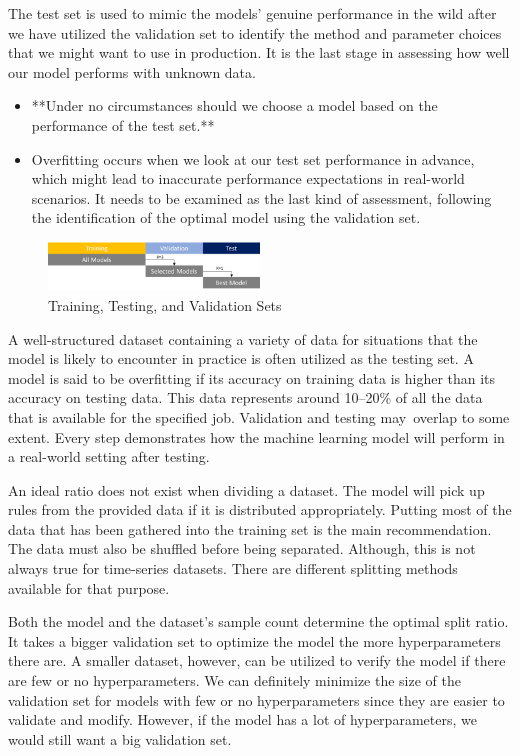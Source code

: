 The test set is used to mimic the models' genuine performance in the wild after we have utilized the validation set to identify the method and parameter choices that we might want to use in production. It is the last stage in assessing how well our model performs with unknown data.

\begin{itemize}
    \item **Under no circumstances should we choose a model based on the performance of the test set.**
    \item Overfitting occurs when we look at our test set performance in advance, which might lead to inaccurate performance expectations in real-world scenarios. It needs to be examined as the last kind of assessment, following the identification of the optimal model using the validation set.
\end{itemize}


\begin{figure}[h]
    \centering
    \includegraphics[width=0.5\textwidth]{images/test.png}
    \caption{Training, Testing, and Validation Sets}
    \end{figure}


    A well-structured dataset containing a variety of data for situations that the model is likely to encounter in practice is often utilized as the testing set. A model is said to be overfitting if its accuracy on training data is higher than its accuracy on testing data. This data represents around 10–20\% of all the data that is available for the specified job. Validation and testing may overlap to some extent. Every step demonstrates how the machine learning model will perform in a real-world setting after testing.

    An ideal ratio does not exist when dividing a dataset. The model will pick up rules from the provided data if it is distributed appropriately. Putting most of the data that has been gathered into the training set is the main recommendation. The data must also be shuffled before being separated. Although, this is not always true for time-series datasets. There are different splitting methods available for that purpose.
    
    Both the model and the dataset's sample count determine the optimal split ratio. It takes a bigger validation set to optimize the model the more hyperparameters there are. A smaller dataset, however, can be utilized to verify the model if there are few or no hyperparameters. We can definitely minimize the size of the validation set for models with few or no hyperparameters since they are easier to validate and modify. However, if the model has a lot of hyperparameters, we would still want a big validation set.
    
